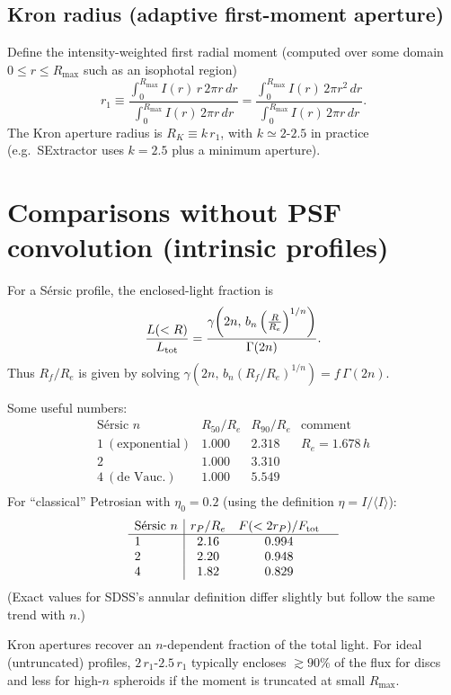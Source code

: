 \documentclass[12pt]{article}
\begin{document}
\subsection*{Kron radius (adaptive first-moment aperture)}
Define the intensity-weighted first radial moment (computed over some domain $0\le r\le R_{\max}$ such as an isophotal region)
\[
r_1 \equiv
\frac{\displaystyle \int_0^{R_{\max}} I(r)\, r\, 2\pi r\,dr}
     {\displaystyle \int_0^{R_{\max}} I(r)\,     2\pi r\,dr}
=\frac{\displaystyle \int_0^{R_{\max}} I(r)\, 2\pi r^2\,dr}
      {\displaystyle \int_0^{R_{\max}} I(r)\, 2\pi r  \,dr}.
\]
The Kron aperture radius is $R_K \equiv k\,r_1$, with $k\simeq 2$-$2.5$ in practice (e.g.\ SExtractor uses $k=2.5$ plus a minimum aperture).

\section*{Comparisons without PSF convolution (intrinsic profiles)}

For a Sérsic profile, the enclosed-light fraction is
\[
\frac{L(<R)}{L_{\rm tot}}
= \frac{\gamma\!\left(2n,\, b_n \left(\frac{R}{R_e}\right)^{1/n}\right)}{\Gamma(2n)}.
\]
Thus $R_f/R_e$ is given by solving $\gamma\!\left(2n,\, b_n (R_f/R_e)^{1/n}\right)= f\,\Gamma(2n)$.

\medskip
Some useful numbers:
\[
\begin{array}{l|ccc}
\text{Sérsic }n & R_{50}/R_e & R_{90}/R_e & \text{comment} \\
\hline
1\ (\text{exponential}) & 1.000 & 2.318 & R_e=1.678\,h \\
2                        & 1.000 & 3.310 & \\
4\ (\text{de Vauc.})    & 1.000 & 5.549 & \\
\end{array}
\]
For ``classical'' Petrosian with $\eta_0=0.2$ (using the definition $\eta=I/\langle I\rangle$):
\[
\begin{array}{l|ccc}
\text{Sérsic }n & r_P/R_e & F(<2r_P)/F_{\rm tot} & \\
\hline
1 & 2.16 & 0.994 & \\
2 & 2.20 & 0.948 & \\
4 & 1.82 & 0.829 & \\
\end{array}
\]
(Exact values for SDSS’s annular definition differ slightly but follow the same trend with $n$.)

Kron apertures recover an $n$-dependent fraction of the total light. For ideal (untruncated) profiles, $2\,r_1$-$2.5\,r_1$ typically encloses $\gtrsim90\%$ of the flux for discs and less for high-$n$ spheroids if the moment is truncated at small $R_{\max}$.
\end{document}
